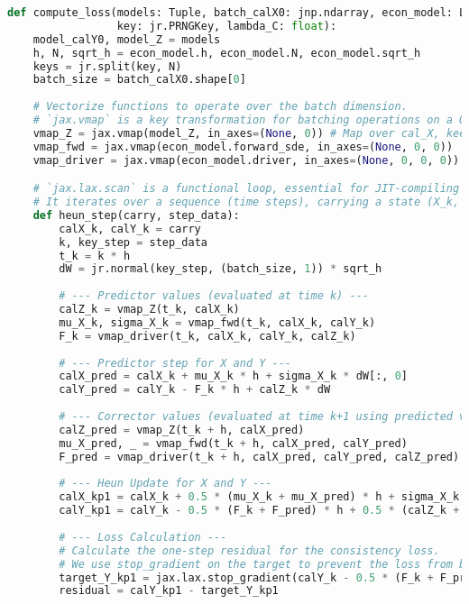 \begin{lstlisting}[language=Python, caption={C.4: JAX Implementation of the Consistency-Regularized Loss with Heun Scheme.}, label={lst:jax_loss_fn_app_appendix}]
def compute_loss(models: Tuple, batch_calX0: jnp.ndarray, econ_model: LucasGEModel, 
                 key: jr.PRNGKey, lambda_C: float):
    model_calY0, model_Z = models
    h, N, sqrt_h = econ_model.h, econ_model.N, econ_model.sqrt_h
    keys = jr.split(key, N)
    batch_size = batch_calX0.shape[0]
    
    # Vectorize functions to operate over the batch dimension.
    # `jax.vmap` is a key transformation for batching operations on a GPU/TPU.
    vmap_Z = jax.vmap(model_Z, in_axes=(None, 0)) # Map over cal_X, keep t fixed
    vmap_fwd = jax.vmap(econ_model.forward_sde, in_axes=(None, 0, 0))
    vmap_driver = jax.vmap(econ_model.driver, in_axes=(None, 0, 0, 0))

    # `jax.lax.scan` is a functional loop, essential for JIT-compiling simulations.
    # It iterates over a sequence (time steps), carrying a state (X_k, Y_k).
    def heun_step(carry, step_data):
        calX_k, calY_k = carry
        k, key_step = step_data
        t_k = k * h
        dW = jr.normal(key_step, (batch_size, 1)) * sqrt_h
        
        # --- Predictor values (evaluated at time k) ---
        calZ_k = vmap_Z(t_k, calX_k)
        mu_X_k, sigma_X_k = vmap_fwd(t_k, calX_k, calY_k)
        F_k = vmap_driver(t_k, calX_k, calY_k, calZ_k)
        
        # --- Predictor step for X and Y ---
        calX_pred = calX_k + mu_X_k * h + sigma_X_k * dW[:, 0]
        calY_pred = calY_k - F_k * h + calZ_k * dW
        
        # --- Corrector values (evaluated at time k+1 using predicted values) ---
        calZ_pred = vmap_Z(t_k + h, calX_pred)
        mu_X_pred, _ = vmap_fwd(t_k + h, calX_pred, calY_pred)
        F_pred = vmap_driver(t_k + h, calX_pred, calY_pred, calZ_pred)
        
        # --- Heun Update for X and Y ---
        calX_kp1 = calX_k + 0.5 * (mu_X_k + mu_X_pred) * h + sigma_X_k * dW[:, 0]
        calY_kp1 = calY_k - 0.5 * (F_k + F_pred) * h + 0.5 * (calZ_k + calZ_pred) * dW
        
        # --- Loss Calculation ---
        # Calculate the one-step residual for the consistency loss.
        # We use stop_gradient on the target to prevent the loss from being zero by construction.
        target_Y_kp1 = jax.lax.stop_gradient(calY_k - 0.5 * (F_k + F_pred) * h + 0.5 * (calZ_k + calZ_pred) * dW)
        residual = calY_kp1 - target_Y_kp1
        

\end{lstlisting}
